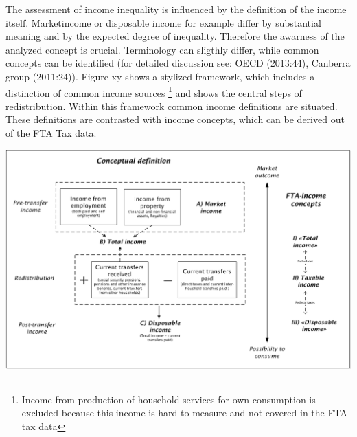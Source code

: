 \documentclass[twoside]{article}\usepackage[]{graphicx}\usepackage[]{color}
\makeatletter
\def\maxwidth{ %
  \ifdim\Gin@nat@width>\linewidth
    \linewidth
  \else
    \Gin@nat@width
  \fi
}
\makeatother
\begin{document}
\begin{multicols}{2}
The assessment of income inequality is influenced by the definition of the income itself. Marketincome or disposable income for example differ by substantial meaning and by the expected degree of inequality. Therefore the awarness of the analyzed concept is crucial. Terminology can sligthly differ, while common concepts can be identified (for detailed discussion see: OECD (2013:44), Canberra group (2011:24)). Figure xy shows a stylized framework, which includes a distinction of common income sources \footnote{Income from production of household services for own consumption is excluded because this income is hard to measure and not covered in the FTA tax data} and shows the central steps of redistribution. Within this framework common income definitions are situated. These definitions are contrasted with income concepts, which can be derived out of the FTA Tax data.

\includegraphics[width=\maxwidth]{figure/income_definition}



\end{multicols}
\end{document}
